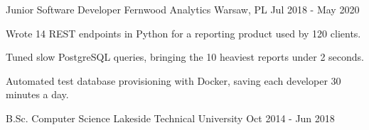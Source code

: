 \documentclass[11pt, a4paper]{awesome-cv}
\begin{document}
\begin{cventries}
  \cventry
    {Junior Software Developer} %
    {Fernwood Analytics} %
    {Warsaw, PL} %
    {Jul 2018 - May 2020} %
    {
      \begin{cvitems} %
        \item {Wrote 14 REST endpoints in Python for a reporting product used by 120 clients.} %
        \item {Tuned slow PostgreSQL queries, bringing the 10 heaviest reports under 2 seconds.} %
        \item {Automated test database provisioning with Docker, saving each developer 30 minutes a day.} %
      \end{cvitems}
    }

\end{cventries}


\begin{cventries}

  \cventry
    {B.Sc. Computer Science} %
    {Lakeside Technical University} %
    {} %
    {Oct 2014 - Jun 2018} %
    {}

\end{cventries}


\begin{cvskills}
\end{cvskills}
\end{document}
